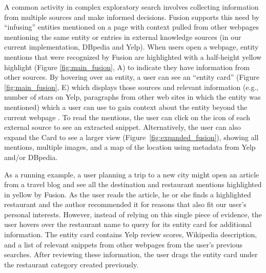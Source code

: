 A common activity in complex exploratory search involves collecting information from multiple sources and make informed decisions.
Fusion supports this need by ``infusing'' entities mentioned on a page with context pulled from other webpages mentioning the same entity or entries in external knowledge sources (in our current implementation, DBpedia and Yelp). When users open a webpage, entity mentions that were recognized by Fusion are highlighted with a half-height yellow highlight (Figure \ref{fig:main_fusion}, A) to indicate they have information from other sources. By hovering over an entity, a user can see an ``entity card'' (Figure \ref{fig:main_fusion}, E) which displays those sources and relevant information (e.g., number of stars on Yelp, paragraphs from other web sites in which the entity was mentioned) which a user can use to gain context about the entity beyond the current webpage \cite{bota}. To read the mentions, the user can click on the icon of each external source to see an extracted snippet. Alternatively, the user can also expand the Card to see a larger view (Figure~\ref{fig:expanded_fusion}), showing all mentions, multiple images, and a map of the location using metadata from Yelp and/or DBpedia. 

As a running example, a user planning a trip to a new city might open an article from a travel blog and see all the destination and restaurant mentions highlighted in yellow by Fusion. As the user reads the article, he or she finds a highlighted restaurant and the author recommended it for reasons that also fit our user's personal interests. However, instead of relying on this single piece of evidence, the user hovers over the restaurant name to query for its entity card for additional information. The entity card contains Yelp review scores, Wikipedia description, and a list of relevant snippets from other webpages from the user's previous searches. After reviewing these information, the user drags the entity card under the restaurant category created previously. 

